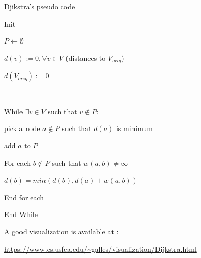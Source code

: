 \begin{frame}{Djikstra's pseudo code}

Init 

$P \leftarrow \emptyset $

$d(v) := 0 , \forall v \in V$ (distances to $V_{orig}$)


$d(V_{orig}) :=0$

~

While $\exists v \in V$ such that $v\notin P$:

\hspace{1cm} pick a node $a \notin P$ such that $d(a)$ is minimum

\hspace{1cm} add $a$ to $P$

\hspace{1cm} For each $ b \notin P$ such that $w(a,b) \neq \infty $

\hspace{2cm} $d(b)=min(d(b),d(a)+w(a,b))$

\hspace{1cm} End for each

End While

\end{frame}


\begin{frame}


A good  visualization is available at :
 
\small
 \url{https://www.cs.usfca.edu/~galles/visualization/Dijkstra.html}
\end{frame}



